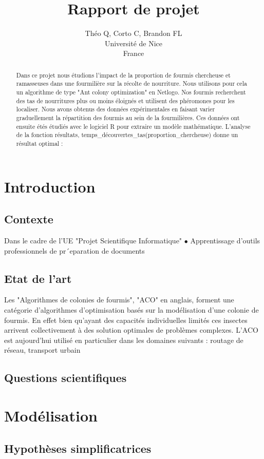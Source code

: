 \documentclass{article}
\title{Rapport de projet}
\author{Théo Q, Corto C, Brandon FL \\
Université de Nice\\
France}
\begin{document}
\maketitle


\begin{abstract}
Dans ce projet nous étudions l'impact de la proportion de fourmis chercheuse et ramasseuses dans une fourmilière sur la récolte de nourriture. Nous utilisons pour cela un algorithme de type "Ant colony optimization" en Netlogo. Nos fourmis recherchent des tas de nourritures plus ou moins éloignés et utilisent des phéromones pour les localiser. Nous avons obtenus des données expérimentales en faisant varier graduellement la répartition des fourmis au sein de la fourmilières. Ces données ont ensuite étés  étudiés avec le logiciel R pour extraire un modèle mathématique. L'analyse de la fonction résultats, temps_découvertes_tas(proportion_chercheuse) donne un résultat optimal :  
 \end{abstract}
\section{Introduction}
\subsection{Contexte}
Dans le cadre de l'UE "Projet Scientifique Informatique" 
$\bullet$ Apprentissage d’outils professionnels de pr´eparation de
documents
\subsection{Etat de l'art}
Les "Algorithmes de colonies de fourmis", "ACO" en anglais, forment une catégorie d'algorithmes d'optimisation basés sur la modélisation d'une colonie de fourmis. En effet bien qu'ayant des capacités individuelles limités ces insectes arrivent collectivement à des solution optimales de problèmes complexes. 
L'ACO est aujourd’hui utilisé en particulier dans les domaines suivants : routage de réseau, transport urbain 
\subsection{Questions scientifiques}
\section{Modélisation}
\subsection{Hypothèses simplificatrices}
\end{document}
